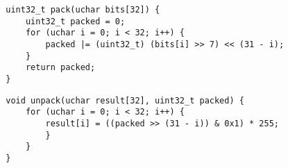 \hspace{-1.1cm}
\begin{minipage}{0.45\textwidth}
    \begin{verbatim}
        uint32_t pack(uchar bits[32]) {
            uint32_t packed = 0;
            for (uchar i = 0; i < 32; i++) {
                packed |= (uint32_t) (bits[i] >> 7) << (31 - i);
            }
            return packed;
        }
    \end{verbatim}
\end{minipage}
\hspace{0.4cm}
\begin{minipage}{0.45\textwidth}
    \begin{verbatim}
        void unpack(uchar result[32], uint32_t packed) {
            for (uchar i = 0; i < 32; i++) {
                result[i] = ((packed >> (31 - i)) & 0x1) * 255;
                }
            }
        }
    \end{verbatim}
\end{minipage}